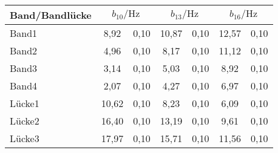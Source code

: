 \label{tab:mu}
	\begin{tabular}{lS[table-format=2.2]@{${}\pm{}$}S[table-format=1.2]S[table-format=2.2]@{${}\pm{}$}S[table-format=1.2]S[table-format=2.2]@{${}\pm{}$}S[table-format=1.2]}
		\toprule
		{Band/Bandlücke} &  &  &  \\
		\midrule
		 Band1  &  8,92 & 0,10 & 10,87 & 0,10 & 12,57 & 0,10\\
		 Band2  &  4,96 & 0,10 &  8,17 & 0,10 & 11,12 & 0,10\\
		 Band3  &  3,14 & 0,10 &  5,03 & 0,10 &  8,92 & 0,10\\
		 Band4  &  2,07 & 0,10 &  4,27 & 0,10 &  6,97 & 0,10\\
		 Lücke1 & 10,62 & 0,10 &  8,23 & 0,10 &  6,09 & 0,10\\
		 Lücke2 & 16,40 & 0,10 & 13,19 & 0,10 &  9,61 & 0,10\\
		 Lücke3 & 17,97 & 0,10 & 15,71 & 0,10 & 11,56 & 0,10\\
		\bottomrule
	\end{tabular}
